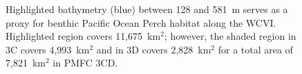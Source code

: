 \documentclass[11pt]{book}
\begin{document}
\setcounter{page}{125}

\setcounter{chapter}{8}   %
\setcounter{figure}{5}	



\begin{figure}[htpb] %
\centering
\setlength\fboxsep{0pt}
\setlength\fboxrule{0pt}
\caption{Highlighted bathymetry (blue) between 128 and 581~m serves as a proxy for benthic Pacific Ocean Perch habitat along the WCVI. Highlighted region covers 11,675~km$^2$; however, the shaded region in 3C covers 4,993~km$^2$ and in 3D covers 2,828~km$^2$ for a total area of 7,821~km$^2$ in PMFC 3CD.}
\label{fig:bathy396-3CD}
\end{figure}
\end{document}
